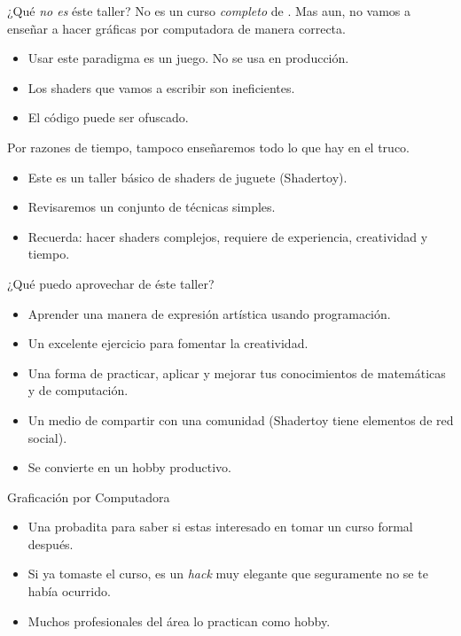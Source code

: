 \begin{frame}{¿Qué \emph{no es} éste taller?}
    No es un curso \emph{completo} de .
    Mas aun, no vamos a enseñar a hacer gráficas por computadora de manera correcta.
    \begin{itemize}
         \item Usar este paradigma \alert{es un juego}. No se usa en producción.
         \item Los shaders que vamos a escribir son ineficientes.
         \item El código puede ser ofuscado.
     \end{itemize}
     Por razones de tiempo, tampoco enseñaremos todo lo que hay en el truco.
     \begin{block}{}
         \begin{itemize}
            \item Este es un taller \alert{básico} de shaders de juguete (Shadertoy).
            \item Revisaremos un conjunto de técnicas simples.
            \item Recuerda: hacer shaders complejos, requiere de experiencia, creatividad y tiempo.
        \end{itemize}  
    \end{block}
\end{frame}

\begin{frame}{¿Qué puedo aprovechar de éste taller?}
    \begin{itemize}
         \item Aprender una manera de expresión artística usando programación.
         \item Un excelente ejercicio para fomentar la creatividad.
         \item Una forma de practicar, aplicar y mejorar tus conocimientos de matemáticas y de computación.
         \item Un medio de compartir con una comunidad (Shadertoy tiene elementos de red social).
         \item Se convierte en un hobby productivo.
     \end{itemize}
     
     \begin{block}{Graficación por Computadora}
         \begin{itemize}
            \item Una probadita para saber si estas interesado en tomar un curso formal después.
            \item Si ya tomaste el curso, es un \emph{hack} muy elegante que seguramente no se te había ocurrido.
            \item Muchos profesionales del área lo practican como hobby.
        \end{itemize}  
    \end{block}
\end{frame}

